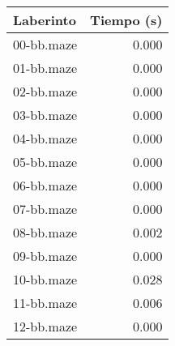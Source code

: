 \begin{tabular}{|l|r|}
\hline
Laberinto & Tiempo (s) \\
\hline
00-bb.maze & 0.000 \\
01-bb.maze & 0.000 \\
02-bb.maze & 0.000 \\
03-bb.maze & 0.000 \\
04-bb.maze & 0.000 \\
05-bb.maze & 0.000 \\
06-bb.maze & 0.000 \\
07-bb.maze & 0.000 \\
08-bb.maze & 0.002 \\
09-bb.maze & 0.000 \\
10-bb.maze & 0.028 \\
11-bb.maze & 0.006 \\
12-bb.maze & 0.000 \\
\hline
\end{tabular}
